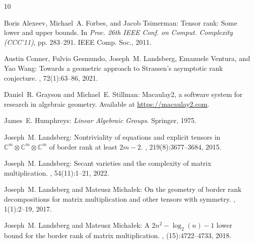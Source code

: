 \documentclass[11pt]{article}
\begin{document}
\tocrefpdfbookmark
\begin{thebibliography}{10}

{\sc Boris Alexeev, Michael~A. Forbes, and Jacob Tsimerman}: Tensor rank:
  {S}ome lower and upper bounds.
\newblock In {\em Proc. 26th IEEE Conf. on Comput. Complexity (CCC'11)}, pp.
  283--291. IEEE Comp. Soc., 2011.

{\sc Austin Conner, Fulvio Gesmundo, Joseph~M. Landsberg, Emanuele Ventura, and
  Yao Wang}: Towards a geometric approach to {S}trassen's asymptotic rank
  conjecture.
, 72(1):63--86, 2021.
\newblock [\epfmtdoi{10.1007/s13348-020-00280-8}]

{\sc Daniel~R. Grayson and Michael~E. Stillman}: Macaulay2, a software system
  for research in algebraic geometry.
\newblock Available at \url{https://macaulay2.com}.

{\sc James~E. Humphreys}: {\em Linear Algebraic Groups}.
\newblock Springer, 1975.
\newblock [\epfmtdoi{{10.1007/978-1-4684-9443-3}}]

{\sc Joseph~M. Landsberg}: Nontriviality of equations and explicit tensors in
  {$\mathbb{C}^m\otimes\mathbb{C}^m\otimes\mathbb{C}^m$} of border rank at
  least {$2m-2$}.
, 219(8):3677--3684, 2015.

{\sc Joseph~M. Landsberg}: Secant varieties and the complexity of matrix
  multiplication.
, 54(11):1--21, 2022.
\newblock [\epfmtdoi{10.13137/2464-8728/34006}]

{\sc Joseph~M. Landsberg and Mateusz Micha{\l}ek}: On the geometry of border
  rank decompositions for matrix multiplication and other tensors with
  symmetry.
, 1(1):2--19, 2017.
\newblock [\epfmtdoi{10.1137/16M1067457}]

{\sc Joseph~M. Landsberg and Mateusz Micha{\l}ek}: A {$2n^2-\log_2(n)-1$} lower
  bound for the border rank of matrix multiplication.
, (15):4722--4733, 2018.


\end{thebibliography}
\end{document}
